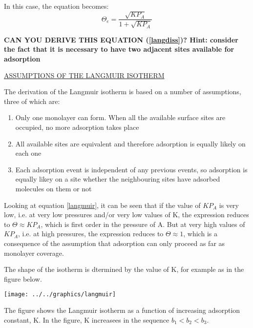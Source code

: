 \documentclass[ignorenonframetext]{beamer}
\begin{document}
\begin{center}\end{center}

In this case, the equation becomes:
\begin{equation}
\Theta_e = \frac{\sqrt{KP_A}}{1+\sqrt{KP_A}}\label{langdiss}
\end{equation}

\textbf{CAN YOU DERIVE THIS EQUATION (\ref{langdiss})? Hint: consider the fact that it is necessary to have two adjacent sites available for adsorption}

\underline{ASSUMPTIONS OF THE LANGMUIR ISOTHERM}

The derivation of the Langmuir isotherm is based on a number of assumptions, three of which are:
\begin{enumerate}
\item Only one monolayer can form. When all the available surface sites are occupied, no more adsorption takes place
\item All available sites are equivalent and therefore adsorption is equally likely on each one
\item Each adsorption event is independent of any previous events, so adsorption is equally likey on a site whether the neighbouring sites have adsorbed molecules on them or not
\end{enumerate}

Looking at equation \ref{langmuir}, it can be seen that if the value of \(KP_A\) is very low, i.e. at very low pressures and/or very low values of K, the expression reduces to \(\Theta \approx KP_A\), which is first order in the pressure of A. But at very high values of \(KP_A\), i.e. at high pressures, the expression reduces to \(\Theta \approx 1\), which is a consequence of the assumption that adsorption can only proceed as far as monolayer coverage. 

The shape of the isotherm is dtermined by the value of K, for example as in the figure below.

\begin{center}\texttt{[image: ../../graphics/langmuir]}\end{center}

The figure shows the Langmuir isotherm as a function of increasing adsorption constant, K. In the figure, K increasees in the sequence \(b_1 < b_2 < b_3\).
\end{document}
